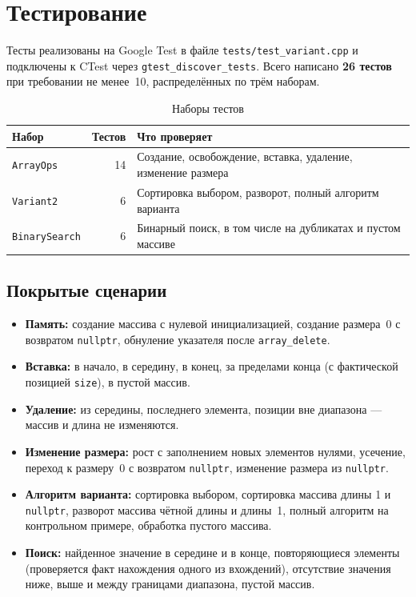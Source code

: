 \section{Тестирование}

Тесты реализованы на Google Test в файле \texttt{tests/test\_variant.cpp} и
подключены к CTest через \texttt{gtest\_discover\_tests}. Всего написано
\textbf{26 тестов} при требовании не менее~10, распределённых по трём наборам.

\begin{table}[htbp]
\centering
\caption{Наборы тестов}
\begin{tabular}{@{}l r >{\raggedright\arraybackslash}p{8cm}@{}}
\hline
\textbf{Набор} & \textbf{Тестов} & \textbf{Что проверяет} \\
\hline
\texttt{ArrayOps} & 14 & Создание, освобождение, вставка, удаление, изменение размера \\
\texttt{Variant2} & 6 & Сортировка выбором, разворот, полный алгоритм варианта \\
\texttt{BinarySearch} & 6 & Бинарный поиск, в том числе на дубликатах и пустом массиве \\
\hline
\end{tabular}
\end{table}

\subsection{Покрытые сценарии}

\begin{itemize}
  \item \textbf{Память:} создание массива с нулевой инициализацией, создание
        размера~0 с возвратом \texttt{nullptr}, обнуление указателя после
        \texttt{array\_delete}.
  \item \textbf{Вставка:} в начало, в середину, в конец, за пределами конца
        (с фактической позицией \texttt{size}), в пустой массив.
  \item \textbf{Удаление:} из середины, последнего элемента, позиции вне
        диапазона --- массив и длина не изменяются.
  \item \textbf{Изменение размера:} рост с заполнением новых элементов нулями,
        усечение, переход к размеру~0 с возвратом \texttt{nullptr}, изменение
        размера из \texttt{nullptr}.
  \item \textbf{Алгоритм варианта:} сортировка выбором, сортировка массива
        длины 1 и \texttt{nullptr}, разворот массива чётной длины и длины~1,
        полный алгоритм на контрольном примере, обработка пустого массива.
  \item \textbf{Поиск:} найденное значение в середине и в конце, повторяющиеся
        элементы (проверяется факт нахождения одного из вхождений), отсутствие
        значения ниже, выше и между границами диапазона, пустой массив.
\end{itemize}

